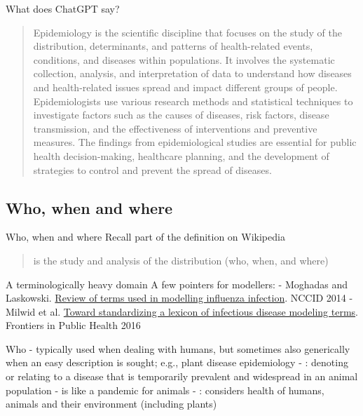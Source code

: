 \documentclass[aspectratio=169]{beamer}\usepackage[]{graphicx}\usepackage[]{xcolor}
\begin{document}
\begin{frame}{What does ChatGPT say?}
\begin{quote}
Epidemiology is the scientific discipline that focuses on the study of the distribution, determinants, and patterns of health-related events, conditions, and diseases within populations. It involves the systematic collection, analysis, and interpretation of data to understand how diseases and health-related issues spread and impact different groups of people. Epidemiologists use various research methods and statistical techniques to investigate factors such as the causes of diseases, risk factors, disease transmission, and the effectiveness of interventions and preventive measures. The findings from epidemiological studies are essential for public health decision-making, healthcare planning, and the development of strategies to control and prevent the spread of diseases.
\end{quote}
\end{frame}

\subsection{Who, when and where}


\begin{frame}{Who, when and where}
Recall part of the definition on Wikipedia
\begin{quote}
 is the study and analysis of the distribution (who, when, and where)  
\end{quote}
\end{frame}


\begin{frame}{A terminologically heavy domain}
A few pointers for modellers:
\vfill
- Moghadas and Laskowski. \href{https://nccid.ca/wp-content/uploads/sites/2/2015/03/ReviewTermsFluWEB.pdf}{Review of terms used in modelling influenza infection}. NCCID 2014
\vfill
- Milwid et al. \href{https://doi.org/10.3389/fpubh.2016.00213}{Toward standardizing a lexicon of infectious disease modeling terms}. Frontiers in Public Health 2016
\end{frame}


\begin{frame}{Who}
-  typically used when dealing with humans, but sometimes also generically when an easy description is sought; e.g., plant disease epidemiology
\vfill
- : denoting or relating to a disease that is temporarily prevalent and widespread in an animal population
\vfill
-  is like a pandemic for animals
\vfill
- : considers health of humans, animals and their environment (including plants)
\end{frame}
\end{document}
